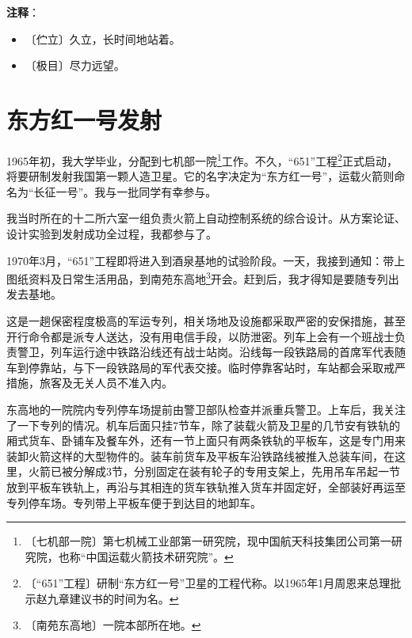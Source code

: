 \documentclass[12pt,UTF-8,openany]{ctexbook}
\begin{document}
\newpage

\textbf{注释}：

\vspace{-1em}

\begin{itemize}
    \setlength\itemsep{-0.2em}
    \item 〔伫立〕久立，长时间地站着。
    \item 〔极目〕尽力远望。
\end{itemize}

\chapter{东方红一号发射}

\begin{normalsize}
    
    1965年初，我大学毕业，分配到七机部一院\footnote{〔七机部一院〕第七机械工业部第一研究院，现中国航天科技集团公司第一研究院，也称“中国运载火箭技术研究院”。}工作。不久，“651”工程\footnote{〔“651”工程〕研制“东方红一号”卫星的工程代称。以1965年1月周恩来总理批示赵九章建议书的时间为名。}正式启动，将要研制发射我国第一颗人造卫星。它的名字决定为“东方红一号”，运载火箭则命名为“长征一号”。我与一批同学有幸参与。
    
    我当时所在的十二所六室一组负责火箭上自动控制系统的综合设计。从方案论证、设计实验到发射成功全过程，我都参与了。
    
    1970年3月，“651”工程即将进入到酒泉基地的试验阶段。一天，我接到通知：带上图纸资料及日常生活用品，到南苑东高地\footnote{〔南苑东高地〕一院本部所在地。}开会。赶到后，我才得知是要随专列出发去基地。
    
    这是一趟保密程度极高的军运专列，相关场地及设施都采取严密的安保措施，甚至开行命令都是派专人送达，没有用电信手段，以防泄密。列车上会有一个班战士负责警卫，列车运行途中铁路沿线还有战士站岗。沿线每一段铁路局的首席军代表随车到停靠站，与下一段铁路局的军代表交接。临时停靠客站时，车站都会采取戒严措施，旅客及无关人员不准入内。
    
    东高地的一院院内专列停车场提前由警卫部队检查并派重兵警卫。上车后，我关注了一下专列的情况。机车后面只挂7节车，除了装载火箭及卫星的几节安有铁轨的厢式货车、卧铺车及餐车外，还有一节上面只有两条铁轨的平板车，这是专门用来装卸火箭这样的大型物件的。装车前货车及平板车沿铁路线被推入总装车间，在这里，火箭已被分解成3节，分别固定在装有轮子的专用支架上，先用吊车吊起一节放到平板车铁轨上，再沿与其相连的货车铁轨推入货车并固定好，全部装好再运至专列停车场。专列带上平板车便于到达目的地卸车。
    

\end{normalsize}
\end{document}
